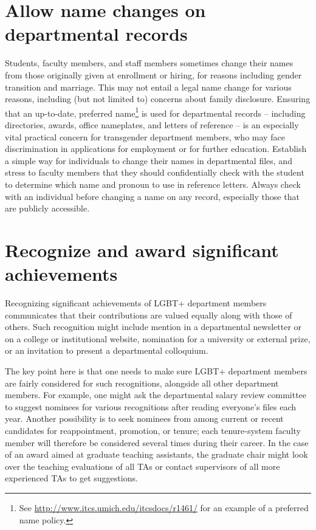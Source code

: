 \section {Allow name changes on departmental records}
\label{name-changes}
Students, faculty members, and staff members sometimes change their names from those originally given at enrollment or hiring, for reasons including gender transition and marriage. This may not entail a legal name change for various reasons, including (but not limited to) concerns about family disclosure. Ensuring that an up-to-date, preferred name\footnote{See \href{http://www.itcs.umich.edu/itcsdocs/r1461/}{http://www.itcs.umich.edu/itcsdocs/r1461/} for an example of a preferred name policy.} is used for departmental records -- including directories, awards, office nameplates, and letters of reference -- is an especially vital practical concern for transgender department members, who may face discrimination in applications for employment or for further education. Establish a simple way for individuals to change their names in departmental files, and stress to faculty members that they should confidentially check with the student to determine which name and pronoun to use in reference letters. Always check with an individual before changing a name on any record, especially those that are publicly accessible.


\section {Recognize and award significant achievements}
\label{recognize-achievements}
Recognizing significant achievements of LGBT+ department members communicates that their contributions are valued equally along with those of others. Such recognition might include mention in a departmental newsletter or on a college or institutional website, nomination for a university or external prize, or an invitation to present a departmental colloquium.

The key point here is that one needs to make sure LGBT+ department members are fairly considered for such recognitions, alongside all other department members. For example, one might ask the departmental salary review committee to suggest nominees for various recognitions after reading everyone's files each year. Another possibility is to seek nominees from among current or recent candidates for reappointment, promotion, or tenure; each tenure-system faculty member will therefore be considered several times during their career. In the case of an award aimed at graduate teaching assistants, the graduate chair might look over the teaching evaluations of all TAs or contact supervisors of all more experienced TAs to get suggestions.

